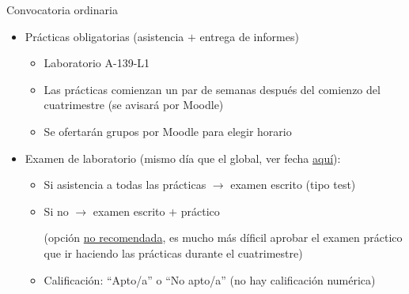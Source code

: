 \documentclass[aspectratio=169, usenames,svgnames,dvipsnames]{beamer}
\begin{document}

\begin{frame}{Convocatoria ordinaria}

    
    \begin{itemize}
        \item \alert{Prácticas obligatorias} (asistencia $+$ entrega de informes)
        \vspace{1mm}
        \begin{itemize}
            \item 
            {\normalsize Laboratorio A-139-L1}
            \vspace{2mm}
            \item {\normalsize Las prácticas comienzan un par de semanas después del comienzo del cuatrimestre (se avisará por Moodle)}
            \vspace{2mm}
            \item {\normalsize Se ofertarán grupos por Moodle para elegir horario}
            \end{itemize}
        
        \vspace{2.5mm}
        \item \alert{Examen de laboratorio} (mismo día que el global, ver fecha \href{https://www.etsidi.upm.es/Estudiantes/AgendaAcademica/AAFechaExamenes}{aquí}):
        \vspace{1mm}
            \begin{itemize}           
            \item {\normalsize Si \alert{asistencia a todas las prácticas} $\rightarrow$ examen escrito (tipo test)}
            \vspace{2mm}
            \item {\normalsize Si no $\rightarrow$ examen escrito $+$ práctico}

            {\normalsize (opción \underline{no recomendada}, es mucho más díficil aprobar el examen práctico que ir haciendo las prácticas durante el cuatrimestre)}
            \vspace{2mm}
            \item {\normalsize Calificación: ``\alert{Apto/a}'' o ``\alert{No apto/a}'' (no hay calificación numérica)}
            \end{itemize}
        \end{itemize}

\end{frame}
\end{document}
